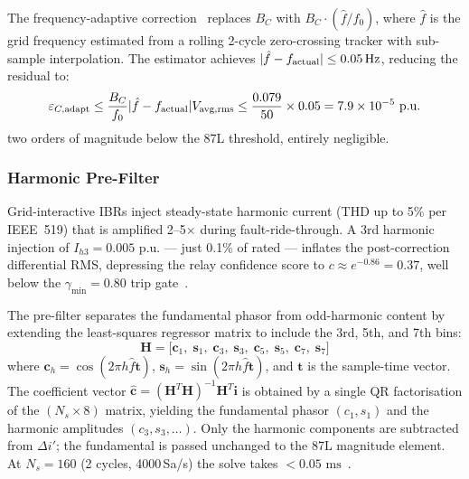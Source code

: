 \documentclass[journal,twoside,10pt]{IEEEtran}
\newcommand{\vect}[1]{\bm{#1}}
\newcommand{\pu}{\,\text{p.u.}}
\newcommand{\ms}{\,\text{ms}}
\begin{document}
The frequency-adaptive correction~\cite{SAMBP_TR20} replaces $B_C$ with
$B_C \cdot (\hat{f}/f_0)$, where $\hat{f}$ is the grid frequency estimated
from a rolling 2-cycle zero-crossing tracker with sub-sample interpolation.
The estimator achieves $|\hat{f} - f_{\rm actual}| \leq 0.05\,\text{Hz}$,
reducing the residual to:
\begin{equation}
  \varepsilon_{C,\rm adapt}
    \leq \frac{B_C}{f_0}|\hat{f} - f_{\rm actual}|V_{\rm avg,rms}
    \leq \frac{0.079}{50} \times 0.05 = 7.9 \times 10^{-5}\,\pu
  \label{eq:adapt_residual}
\end{equation}
two orders of magnitude below the 87L threshold, entirely negligible.

\subsubsection{Harmonic Pre-Filter}
\label{sec:harmonic_filter}

Grid-interactive IBRs inject steady-state harmonic current (THD up to 5\%
per IEEE~519) that is amplified 2--5$\times$ during fault-ride-through.
A 3rd harmonic injection of $I_{h3} = 0.005\,\pu$ --- just 0.1\% of rated
--- inflates the post-correction differential RMS, depressing the relay
confidence score to $c \approx e^{-0.86} = 0.37$, well below the
$\gamma_{\min} = 0.80$ trip gate~\cite{SAMBP_TR21}.

The pre-filter separates the fundamental phasor from odd-harmonic content
by extending the least-squares regressor matrix to include the 3rd, 5th,
and 7th bins:
\begin{equation}
  \mathbf{H} = \bigl[\mathbf{c}_1,\; \mathbf{s}_1,\;
                      \mathbf{c}_3,\; \mathbf{s}_3,\;
                      \mathbf{c}_5,\; \mathbf{s}_5,\;
                      \mathbf{c}_7,\; \mathbf{s}_7\bigr]
  \label{eq:H}
\end{equation}
where $\mathbf{c}_h = \cos(2\pi h\hat{f} \mathbf{t})$,
$\mathbf{s}_h = \sin(2\pi h\hat{f} \mathbf{t})$, and $\mathbf{t}$ is the
sample-time vector.
The coefficient vector $\hat{\boldsymbol{c}} = (\mathbf{H}^T\mathbf{H})^{-1}\mathbf{H}^T\vect{i}$
is obtained by a single QR factorisation of the $(N_s \times 8)$ matrix,
yielding the fundamental phasor $(c_1, s_1)$ and the harmonic amplitudes
$(c_3, s_3, \ldots)$.  Only the harmonic components are subtracted from
$\Delta i'$; the fundamental is passed unchanged to the 87L magnitude
element.  At $N_s = 160$ (2 cycles, 4000\,Sa/s) the solve takes
${<}0.05\,\ms$~\cite{Sachdev1988,Oppenheim1999}.
\end{document}
